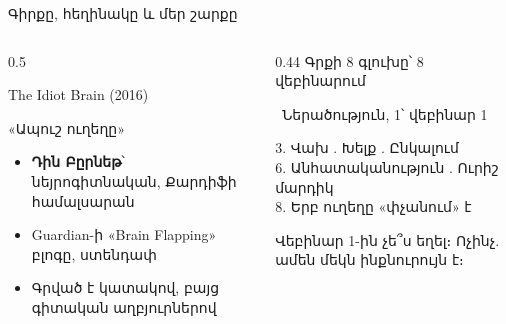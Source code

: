 \begin{frame}{Գիրքը, հեղինակը և մեր շարքը}
  \begin{columns}[T]
    \begin{column}{0.5\textwidth}
      \begin{card}
        {\blackfont\Large The Idiot Brain} {\small (2016)}\par
        «Ապուշ ուղեղը»\par\medskip
        \begin{itemize}
          \item \textbf{Դին Բըրնեթ}՝ նեյրոգիտնական, Քարդիֆի համալսարան
          \item Guardian-ի «Brain Flapping» բլոգը, ստենդափ
          \item Գրված է կատակով, բայց գիտական աղբյուրներով
        \end{itemize}
        \vspace{-1mm}
      \end{card}
    \end{column}
    \begin{column}{0.44\textwidth}
      {\blackfont\small Գրքի 8 գլուխը՝ 8 վեբինարում}\par\smallskip
      {\color{plum!55!cream}\small {}\ Ներածություն, 1՝ վեբինար 1}\par\smallskip
      \par\smallskip
      {\color{plum!55!cream}\small
      3. Վախ . Խելք . Ընկալում\\
      6. Անհատականություն . Ուրիշ մարդիկ\\
      8. Երբ ուղեղը «փչանում» է}\par\smallskip
      \begin{card}[colback=mint!35!cardwhite]
        Վեբինար 1-ին չե՞ս եղել։ Ոչինչ. ամեն մեկն ինքնուրույն է։
      \end{card}
    \end{column}
  \end{columns}
\end{frame}

